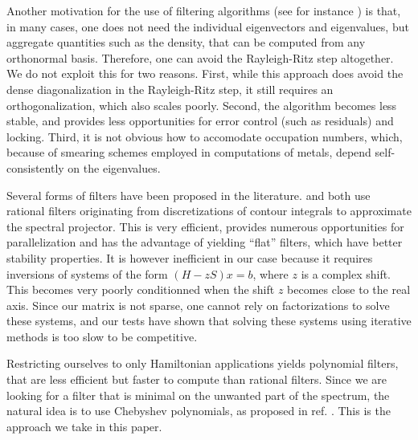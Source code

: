 \documentclass[11pt]{elsarticle}
\begin{document}
Another motivation for the use of filtering algorithms (see for
instance \cite{bekas2005computing}) is that, in many cases, one does
not need the individual eigenvectors and eigenvalues, but aggregate
quantities such as the density, that can be computed from any
orthonormal basis. Therefore, one can avoid the Rayleigh-Ritz step
altogether. We do not exploit this for two reasons. First, while this
approach does avoid the dense diagonalization in the Rayleigh-Ritz
step, it still requires an orthogonalization, which also scales
poorly. Second, the algorithm becomes less stable, and provides less
opportunities for error control (such as residuals) and
locking. Third, it is not obvious how to accomodate occupation
numbers, which, because of smearing schemes employed in computations
of metals, depend self-consistently on the eigenvalues.

Several forms of filters have been proposed in the
literature. \cite{polizzi} and \cite{sakurai2003projection} both use
rational filters originating from discretizations of contour integrals
to approximate the spectral projector. This is very efficient,
provides numerous opportunities for parallelization and has the
advantage of yielding ``flat'' filters, which have better stability
properties. It is however inefficient in our case because it requires
inversions of systems of the form $(H - z S) x = b$, where $z$ is a
complex shift. This becomes very poorly conditionned when the shift
$z$ becomes close to the real axis. Since our matrix is not sparse,
one cannot rely on factorizations to solve these systems, and our
tests have shown that solving these systems using iterative methods is
too slow to be competitive.

Restricting ourselves to only Hamiltonian applications yields
polynomial filters, that are less efficient but faster to compute than
rational filters. Since we are looking for a filter that is minimal on
the unwanted part of the spectrum, the natural idea is to use
Chebyshev polynomials, as proposed in ref. \cite{seq_chebfi}. This is
the approach we take in this paper.

\end{document}
